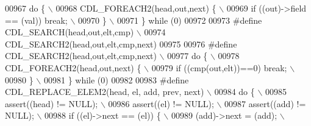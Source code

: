\begin{DoxyCode}
00967 \textcolor{preprocessor}{do \{                                                                                           \(\backslash\)}
00968 \textcolor{preprocessor}{    CDL\_FOREACH2(head,out,next) \{                                                              \(\backslash\)}
00969 \textcolor{preprocessor}{      if ((out)->field == (val)) break;                                                        \(\backslash\)}
00970 \textcolor{preprocessor}{    \}                                                                                          \(\backslash\)}
00971 \textcolor{preprocessor}{\} while (0)}
00972 
00973 \textcolor{preprocessor}{#define CDL\_SEARCH(head,out,elt,cmp)                                                           \(\backslash\)}
00974 \textcolor{preprocessor}{    CDL\_SEARCH2(head,out,elt,cmp,next)}
00975 
00976 \textcolor{preprocessor}{#define CDL\_SEARCH2(head,out,elt,cmp,next)                                                     \(\backslash\)}
00977 \textcolor{preprocessor}{do \{                                                                                           \(\backslash\)}
00978 \textcolor{preprocessor}{    CDL\_FOREACH2(head,out,next) \{                                                              \(\backslash\)}
00979 \textcolor{preprocessor}{      if ((cmp(out,elt))==0) break;                                                            \(\backslash\)}
00980 \textcolor{preprocessor}{    \}                                                                                          \(\backslash\)}
00981 \textcolor{preprocessor}{\} while (0)}
00982 
00983 \textcolor{preprocessor}{#define CDL\_REPLACE\_ELEM2(head, el, add, prev, next)                                           \(\backslash\)}
00984 \textcolor{preprocessor}{do \{                                                                                           \(\backslash\)}
00985 \textcolor{preprocessor}{ assert((head) != NULL);                                                                       \(\backslash\)}
00986 \textcolor{preprocessor}{ assert((el) != NULL);                                                                         \(\backslash\)}
00987 \textcolor{preprocessor}{ assert((add) != NULL);                                                                        \(\backslash\)}
00988 \textcolor{preprocessor}{ if ((el)->next == (el)) \{                                                                     \(\backslash\)}
00989 \textcolor{preprocessor}{  (add)->next = (add);                                                                         \(\backslash\)}

\end{DoxyCode}
